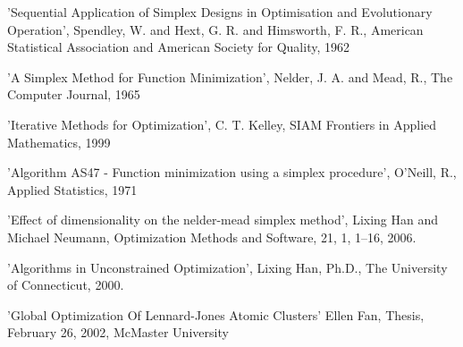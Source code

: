 %
\begin{References}\relax
'Sequential Application of Simplex Designs in Optimisation and Evolutionary
Operation', Spendley, W. and Hext, G. R. and Himsworth, F. R., American
Statistical Association and American Society for Quality, 1962

'A Simplex Method for Function Minimization', Nelder, J. A. and Mead, R., The
Computer Journal, 1965

'Iterative Methods for Optimization', C. T. Kelley, SIAM Frontiers in Applied
Mathematics, 1999

'Algorithm AS47 - Function minimization using a simplex procedure', O'Neill, R.,
Applied Statistics, 1971

'Effect of dimensionality on the nelder-mead simplex method', Lixing Han and
Michael Neumann, Optimization Methods and Software, 21, 1, 1--16, 2006.

'Algorithms in Unconstrained Optimization', Lixing Han, Ph.D., The University of
Connecticut, 2000.

'Global Optimization Of Lennard-Jones Atomic Clusters' Ellen Fan, Thesis,
February 26, 2002, McMaster University
\end{References}
%
\begin{SeeAlso}\relax
{}
\end{SeeAlso}
%
